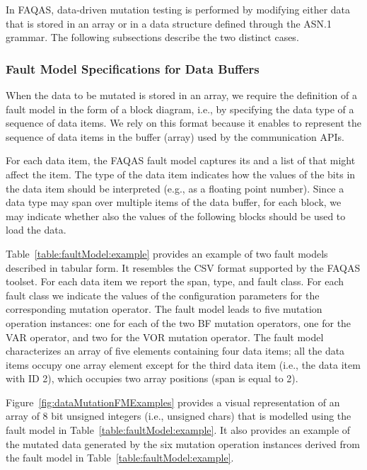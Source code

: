 In FAQAS, data-driven mutation testing is performed by modifying either data that is stored in an array or in a data structure defined through the ASN.1 grammar. The following subsections describe the two distinct cases.









\clearpage

\subsubsection{Fault Model Specifications for Data Buffers}

When the data to be mutated is stored in an array, we require the definition of a fault model in the form of a block diagram, i.e., by specifying the data type of a sequence of data items. We rely on this format because it enables to represent the sequence of data items in the buffer (array) used by the communication APIs.
 
For each data item, the FAQAS fault model captures its  and a list of  that might affect the item. 
The type of the data item indicates how the values of the bits in the data item should be interpreted (e.g., as a floating point number). Since a data type may span over multiple items of the data buffer, for each block, we may indicate whether also the values of the following blocks should be used to load the data.

Table~\ref{table:faultModel:example} provides an example of two fault models described in tabular form. 
It resembles the CSV format supported by the FAQAS toolset. For each data item we report the span, type, and fault class. For each fault class we indicate the values of the configuration parameters for the corresponding mutation operator. The fault model  leads to five mutation operation instances: one for each of the two BF mutation operators, one for the VAR operator, and two for the VOR mutation operator. The fault model characterizes an array of five elements containing four data items; all the data items occupy one array element except for the third data item (i.e., the data item with ID 2), which occupies two array positions (span is equal to 2).

Figure~\ref{fig:dataMutationFMExamples} provides a visual representation of an array of 8 bit unsigned integers (i.e., unsigned chars) that is modelled using the  fault model in Table~\ref{table:faultModel:example}. It also provides an example of the mutated data generated by the six mutation operation instances derived from the fault model in Table~\ref{table:faultModel:example}.


